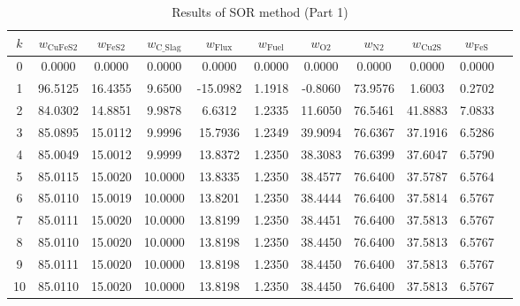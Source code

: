 \documentclass[10pt]{article}
\begin{document}
\begin{table}[H]
\centering
\caption{Results of SOR method (Part 1)}
\begin{tabular}{ccccccccccc}
\toprule
\( k \) & \( w_{\text{CuFeS2}} \) & \( w_{\text{FeS2}} \) & \( w_{\text{C\_Slag}} \) & \( w_{\text{Flux}} \) & \( w_{\text{Fuel}} \) & \( w_{\text{O2}} \) & \( w_{\text{N2}} \) & \( w_{\text{Cu2S}} \) & \( w_{\text{FeS}} \) \\
\midrule
0 & 0.0000 & 0.0000 & 0.0000 & 0.0000 & 0.0000 & 0.0000 & 0.0000 & 0.0000 & 0.0000 \\
1 & 96.5125 & 16.4355 & 9.6500 & -15.0982 & 1.1918 & -0.8060 & 73.9576 & 1.6003 & 0.2702 \\
2 & 84.0302 & 14.8851 & 9.9878 & 6.6312 & 1.2335 & 11.6050 & 76.5461 & 41.8883 & 7.0833 \\
3 & 85.0895 & 15.0112 & 9.9996 & 15.7936 & 1.2349 & 39.9094 & 76.6367 & 37.1916 & 6.5286 \\
4 & 85.0049 & 15.0012 & 9.9999 & 13.8372 & 1.2350 & 38.3083 & 76.6399 & 37.6047 & 6.5790 \\
5 & 85.0115 & 15.0020 & 10.0000 & 13.8335 & 1.2350 & 38.4577 & 76.6400 & 37.5787 & 6.5764 \\
6 & 85.0110 & 15.0019 & 10.0000 & 13.8201 & 1.2350 & 38.4444 & 76.6400 & 37.5814 & 6.5767 \\
7 & 85.0111 & 15.0020 & 10.0000 & 13.8199 & 1.2350 & 38.4451 & 76.6400 & 37.5813 & 6.5767 \\
8 & 85.0110 & 15.0020 & 10.0000 & 13.8198 & 1.2350 & 38.4450 & 76.6400 & 37.5813 & 6.5767 \\
9 & 85.0111 & 15.0020 & 10.0000 & 13.8198 & 1.2350 & 38.4450 & 76.6400 & 37.5813 & 6.5767 \\
10 & 85.0110 & 15.0020 & 10.0000 & 13.8198 & 1.2350 & 38.4450 & 76.6400 & 37.5813 & 6.5767 \\
\bottomrule
\end{tabular}
\end{table}
\end{document}
